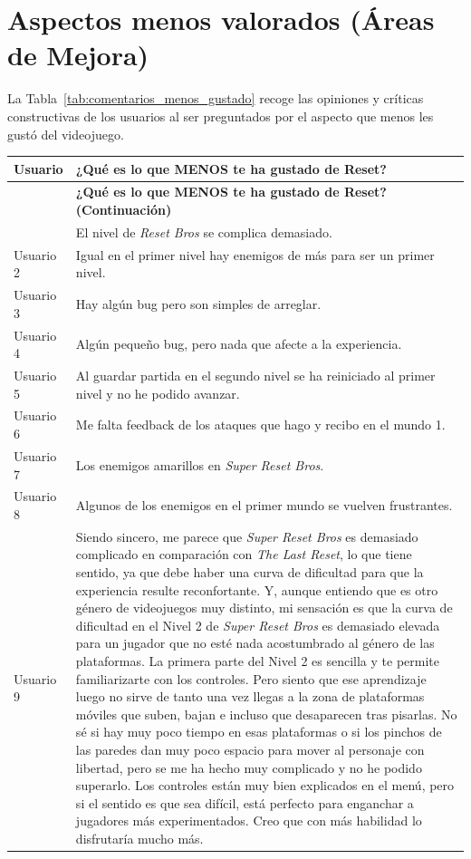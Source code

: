 \newpage

\section{Aspectos menos valorados (Áreas de Mejora)}
La Tabla~\ref{tab:comentarios_menos_gustado} recoge las opiniones y críticas constructivas de los usuarios al ser preguntados por el aspecto que menos les gustó del videojuego.

\begin{longtable}{|l|p{13.5cm}|}
\hline
\textbf{Usuario} & \textbf{¿Qué es lo que MENOS te ha gustado de Reset?} \\ \hline
\end{firsthead}
\hline
\textbf{Usuario} & \textbf{¿Qué es lo que MENOS te ha gustado de Reset? (Continuación)} \\ \hline
\end{head}
\hline
\end{foot}
\hline
\end{lastfoot}
Usuario 1 & El nivel de \textit{Reset Bros} se complica demasiado. \\ \hline
Usuario 2 & Igual en el primer nivel hay enemigos de más para ser un primer nivel. \\ \hline
Usuario 3 & Hay algún bug pero son simples de arreglar. \\ \hline
Usuario 4 & Algún pequeño bug, pero nada que afecte a la experiencia. \\ \hline
Usuario 5 & Al guardar partida en el segundo nivel se ha reiniciado al primer nivel y no he podido avanzar. \\ \hline
Usuario 6 & Me falta feedback de los ataques que hago y recibo en el mundo 1. \\ \hline
Usuario 7 & Los enemigos amarillos en \textit{Super Reset Bros}. \\ \hline
Usuario 8 & Algunos de los enemigos en el primer mundo se vuelven frustrantes. \\ \hline
Usuario 9 & Siendo sincero, me parece que \textit{Super Reset Bros} es demasiado complicado en comparación con \textit{The Last Reset}, lo que tiene sentido, ya que debe haber una curva de dificultad para que la experiencia resulte reconfortante. Y, aunque entiendo que es otro género de videojuegos muy distinto, mi sensación es que la curva de dificultad en el Nivel 2 de \textit{Super Reset Bros} es demasiado elevada para un jugador que no esté nada acostumbrado al género de las plataformas. La primera parte del Nivel 2 es sencilla y te permite familiarizarte con los controles. Pero siento que ese aprendizaje luego no sirve de tanto una vez llegas a la zona de plataformas móviles que suben, bajan e incluso que desaparecen tras pisarlas. No sé si hay muy poco tiempo en esas plataformas o si los pinchos de las paredes dan muy poco espacio para mover al personaje con libertad, pero se me ha hecho muy complicado y no he podido superarlo. Los controles están muy bien explicados en el menú, pero si el sentido es que sea difícil, está perfecto para enganchar a jugadores más experimentados. Creo que con más habilidad lo disfrutaría mucho más. \\ \hline

\end{longtable}
